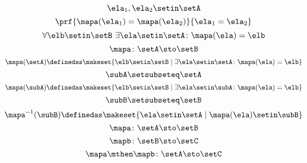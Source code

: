 \begin{forslides}
    \begin{equation}
        \label{eq:slides_session2_122}
        \ela_1, \ela_2 \setin\setA
    \end{equation}
    \begin{equation}
        \label{eq:slides_session2_123}
        \prf{\mapa(\ela_1) = \mapa(\ela_2)}{\ela_1 = \ela_2}
    \end{equation}
    \begin{equation}
        \label{eq:slides_session2_124}
        \forall \elb \setin\setB \ \exists  \ela \setin\setA \colon \mapa(\ela) = \elb
    \end{equation}
    \begin{equation}
        \label{eq:slides_session2_125}
        \mapa\colon \setA \sto \setB
    \end{equation}
    \begin{equation}
        \label{eq:slides_session2_126}
        \mapa(\setA) \definedas \makeset{ \elb \setin\setB \mid \exists \ela \setin\setA \colon \mapa(\ela) = \elb }
    \end{equation}
    \begin{equation}
        \label{eq:slides_session2_127}
        \subA \setsubseteq \setA
    \end{equation}
    \begin{equation}
        \label{eq:slides_session2_128}
        \mapa(\subA) \definedas \makeset{ \elb \setin\setB \mid \exists \ela \setin \subA \colon \mapa(\ela) = \elb }
    \end{equation}
    \begin{equation}
        \label{eq:slides_session2_129}
        \subB \setsubseteq \setB
    \end{equation}
    \begin{equation}
        \label{eq:slides_session2_130}
        \mapa^{-1}(\subB) \definedas \makeset{ \ela \setin\setA \mid  \mapa(\ela) \setin \subB}
    \end{equation}
    \begin{equation}
        \label{eq:slides_session2_131}
        \mapa\colon \setA \sto \setB
    \end{equation}
    \begin{equation}
        \label{eq:slides_session2_132}
        \mapb \colon \setB \sto \setC
    \end{equation}
    \begin{equation}
        \label{eq:slides_session2_133}
        \mapa \mthen \mapb \colon \setA \sto \setC
    \end{equation}

\end{forslides}
